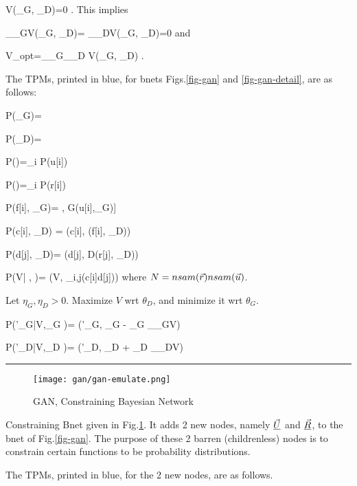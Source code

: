 \beq
\delta V(\theta_G, \theta_D)=0
\;.
\eeq
This implies

\beq
 \partial_{\theta_G}V(\theta_G, \theta_D)=
 \partial_{\theta_D}V(\theta_G, \theta_D)=0
\;
\eeq
and

\beq
V_{opt}=\min_{\theta_G}\max_{\theta_D} V(\theta_G, \theta_D)
\;.
\eeq

The TPMs, printed in blue,
for bnets Figs.\ref{fig-gan} and \ref{fig-gan-detail},
are
as follows:

\beq\color{blue}
P(\theta_G)=
\eeq

\beq\color{blue}
P(\theta_D)=
\eeq


\beq\color{blue}
P(\vecu)=\prod_i P(u[i])  \;
\eeq

\beq\color{blue}
P(\vecr)=\prod_i P(r[i])
\eeq


\beq\color{blue}
P(f[i]\cond \vecu, \theta_G)= \delta[f[i], G(u[i],\theta_G)]
\eeq

\beq\color{blue}
P(c[i]\cond \vecf, \theta_D) = \delta(c[i], (f[i], \theta_D))
\eeq

\beq\color{blue}
P(d[j]\cond \vecr, \theta_D)= \delta(d[j], D(r[j], \theta_D))
\eeq




\beq\color{blue}
P(V| \vecd,  \vecc)=
\delta(V, \ln \prod_{i,j}(c[i]d[j]))
\eeq
where $N=nsam({\vec{r}})nsam({\vec{u}})$.


Let $\eta_G, \eta_D> 0$. Maximize $V$ wrt $\theta_D$, and
minimize it wrt $\theta_G$.

\beq\color{blue}
P(\theta'_G|V,\theta_G )=
\delta(\theta'_G, \theta_G - \eta_G 
\partial_{\theta_G}V)
\eeq

\beq\color{blue}
P(\theta'_D|V,\theta_D )=
\delta(\theta'_D, \theta_D + \eta_D 
\partial_{\theta_D}V)
\eeq

\hrule
\begin{figure}[h!]
\centering
\texttt{[image: gan/gan-emulate.png]}
\caption{GAN, Constraining Bayesian Network}
\label{fig-gan-emulate} 
\end{figure}

Constraining Bnet given in Fig.\ref{fig-gan-emulate}. It adds 2 new nodes, namely $\underline{\vec{U}}$ and $\underline{\vec{R}}$, to  the bnet of Fig.\ref{fig-gan}. The purpose of these 2  barren (childrenless) nodes is to constrain certain functions to be probability distributions.

The TPMs,
printed in blue, for the 2 new nodes, are as follows.


